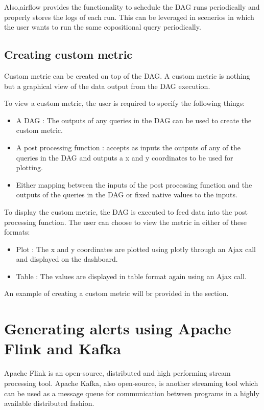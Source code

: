 \documentclass[letterpaper,10pt,english]{sphinxmanual}
\begin{document}
Also,airflow provides the functionality to schedule the DAG runs periodically and properly stores the logs of each run. This can be leveraged in scenerios in which the user wants to run the same copositional query periodically.


\section{Creating custom metric}
\label{\detokenize{dag:creating-custom-metric}}
Custom metric can be created on top of the DAG. A custom metric is nothing but a graphical view of the data output from the DAG execution.

To view a custom metric, the user is required to specify the following things:
\begin{itemize}
\item {} 
A DAG : The outputs of any queries in the DAG can be used to create the custom metric.

\item {} 
A post processing function : accepts as inputs the outputs of any of the queries in the DAG and outputs a x and y coordinates to be used for plotting.

\item {} 
Either mapping between the inputs of the post processing function and the outputs of the queries in the DAG or fixed native values to the inputs.

\end{itemize}

To display the custom metric, the DAG is executed to feed data into the post processing function. The user can choose to view the metric in either of these formats:
\begin{itemize}
\item {} 
Plot : The x and y coordinates are plotted using plotly through an Ajax call and displayed on the dashboard.

\item {} 
Table : The values are displayed in table format again using an Ajax call.

\end{itemize}

An example of creating a custom metric will br provided in the {\hyperref[\detokenize{dashboard_website:dashboard-website}]{}} section.


\chapter{Generating alerts using Apache Flink and Kafka}
\label{\detokenize{flink:generating-alerts-using-apache-flink-and-kafka}}\label{\detokenize{flink::doc}}
Apache Flink is an open-source, distributed and high performing stream processing tool. Apache Kafka, also open-source, is another streaming tool which can be used as a message queue for communication between programs in a highly available distributed fashion.
\end{document}
